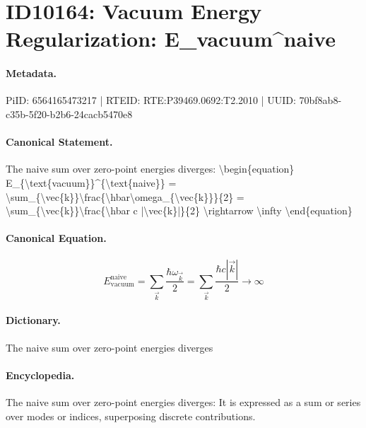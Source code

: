 \section*{ID10164: Vacuum Energy Regularization: E\_vacuum\textasciicircum{}naive}
\paragraph{Metadata.}
PiID: 6564165473217 | RTEID: RTE:P39469.0692:T2.2010 | UUID: 70bf8ab8-c35b-5f20-b2b6-24cacb5470e8

\paragraph{Canonical Statement.}
The naive sum over zero-point energies diverges: \textbackslash{}begin\{equation\} E\_\{\textbackslash{}text\{vacuum\}\}\textasciicircum{}\{\textbackslash{}text\{naive\}\} = \textbackslash{}sum\_\{\textbackslash{}vec\{k\}\}\textbackslash{}frac\{\textbackslash{}hbar\textbackslash{}omega\_\{\textbackslash{}vec\{k\}\}\}\{2\} = \textbackslash{}sum\_\{\textbackslash{}vec\{k\}\}\textbackslash{}frac\{\textbackslash{}hbar c |\textbackslash{}vec\{k\}|\}\{2\} \textbackslash{}rightarrow \textbackslash{}infty \textbackslash{}end\{equation\}

\paragraph{Canonical Equation.}
\[
E_{\text{vacuum}}^{\text{naive}} = \sum_{\vec{k}}\frac{\hbar\omega_{\vec{k}}}{2} = \sum_{\vec{k}}\frac{\hbar c |\vec{k}|}{2} \rightarrow \infty
\]

\paragraph{Dictionary.}
The naive sum over zero-point energies diverges

\paragraph{Encyclopedia.}
The naive sum over zero-point energies diverges: It is expressed as a sum or series over modes or indices, superposing discrete contributions.
